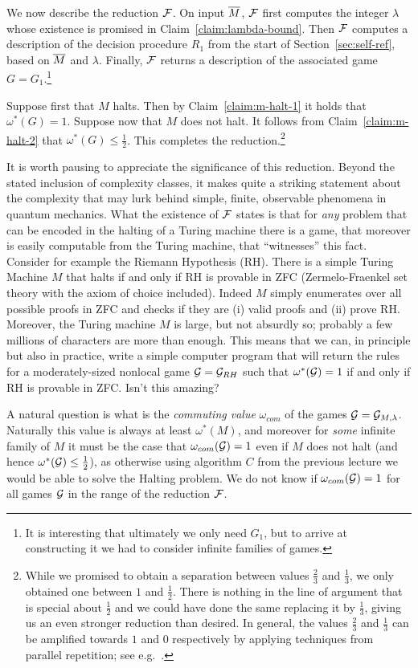 We now describe the reduction $\mathcal{F}$. On input $\overline{M}$, $\mathcal{F}$ first computes the integer $\lambda$ whose existence is promised in Claim~\ref{claim:lambda-bound}. Then $\mathcal{F}$ computes a description of the decision procedure $R_1$ from the start of Section~\ref{sec:self-ref}, based on $\overline{M}$ and $\lambda$. Finally, $\mathcal{F}$ returns a description of the associated game $G=G_1$.\footnote{It is interesting that ultimately we only need $G_1$, but to arrive at constructing it we had to consider infinite families of games.} 

Suppose first that $M$ halts. Then by Claim~\ref{claim:m-halt-1} it holds that  $\omega^*(G)=1$. Suppose now that $M$ does not halt. It follows from Claim~\ref{claim:m-halt-2} that $\omega^*(G)\leq \frac{1}{2}$. 
This completes the reduction.\footnote{While we promised to obtain a separation between values $\frac{2}{3}$ and $\frac{1}{3}$, we only obtained one between $1$ and $\frac{1}{2}$. There is nothing in the line of argument that is special about $\frac{1}{2}$ and we could have done the same replacing it by $\frac{1}{3}$, giving us an even stronger reduction than desired. In general, the values $\frac{2}{3}$ and $\frac{1}{3}$ can be amplified towards $1$ and $0$ respectively by applying techniques from parallel repetition; see e.g.~\cite{yuen2016parallel}.}

\begin{remark}
It is worth pausing to appreciate the significance of this reduction. Beyond the stated inclusion of complexity classes, it makes quite a striking statement about the complexity that may lurk behind simple, finite, observable phenomena in quantum mechanics. What the existence of $\mathcal{F}$ states is that for \emph{any} problem that can be encoded in the halting of a Turing machine there is a game, that moreover is easily computable from the Turing machine, that ``witnesses'' this fact. Consider for example the Riemann Hypothesis (RH). There is a simple Turing Machine $M$ that halts if and only if RH is provable in ZFC (Zermelo-Fraenkel set theory with the axiom of choice included). Indeed $M$ simply enumerates over all possible proofs in ZFC and checks if they are (i) valid proofs and (ii) prove RH. Moreover, the Turing machine $M$ is large, but not absurdly so; probably a few millions of characters are more than enough. This means that we can, in principle but also in practice, write a simple computer program that will return the rules for a moderately-sized nonlocal game $\mathcal{G}=\mathcal{G}_{RH}$ such that $\omega^*(\mathcal{G})=1$ if and only if RH is provable in ZFC. Isn't this amazing?
\end{remark}

\begin{remark}
A natural question is what is the \emph{commuting value} $\omega_{com}$ of the games $\mathcal{G}=\mathcal{G}_{M,\lambda}$. Naturally this value is always at least $\omega^*(M)$, and moreover for \emph{some} infinite family of $M$ it must be the case that $\omega_{com}(\mathcal{G})=1$ even if $M$ does not halt (and hence $\omega^*(\mathcal{G}) \leq \frac{1}{2}$), as otherwise using algorithm $C$ from the previous lecture we would be able to solve the Halting problem. We do not know if $\omega_{com}(\mathcal{G})=1$ for all games $\mathcal{G}$ in the range of the reduction $\mathcal{F}$. 
\end{remark}